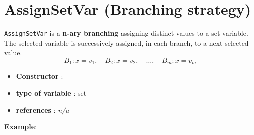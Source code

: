 \section{AssignSetVar (Branching strategy)}\label{assignsetvar:assignsetvarbranchstrat}\hypertarget{assignsetvar:assignsetvarbranchstrat}{}
\begin{notedef}
  \texttt{AssignSetVar} is a \textbf{n-ary branching} assigning distinct values to a set variable. The selected variable is successively assigned, in each branch, to a next selected value.
$$B_1: x=v_1,\quad B_2: x= v_2,\quad\ldots,\quad B_m: x= v_m$$
\end{notedef}

\begin{itemize}
	\item \textbf{Constructor} :
	\item \textbf{type of variable} : set
	\item \textbf{references} : \emph{n/a}
\end{itemize}

\textbf{Example}:
%

